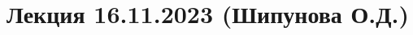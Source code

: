 \documentclass[main.tex]{subfiles}
\begin{document}
\section{Лекция 16.11.2023 (Шипунова О.Д.)}
\end{document}
